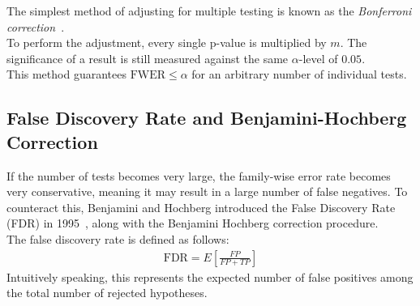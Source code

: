 The simplest method of adjusting for multiple testing is known as the \emph{Bonferroni correction}~\cite{bonferroni}.\\
To perform the adjustment, every single p-value is multiplied by $m$. The significance of a result is still measured against the same $\alpha$-level of $0.05$.\\
This method guarantees $\text{FWER} \leq \alpha$ for an arbitrary number of individual tests.

\subsection{False Discovery Rate and Benjamini-Hochberg Correction}\label{subsec:multi_benjamini_hochberg}
If the number of tests becomes very large, the family-wise error rate becomes very conservative, meaning it may result in a large number of false negatives. To counteract this, Benjamini and Hochberg introduced the False Discovery Rate (FDR) in 1995~\cite{benjamini_hochberg}, along with the Benjamini Hochberg correction procedure.\\
The false discovery rate is defined as follows:
\begin{align}
	\text{FDR} = E\left[\frac{FP}{FP + TP}\right]%
\end{align}
Intuitively speaking, this represents the expected number of false positives among the total number of rejected hypotheses.

